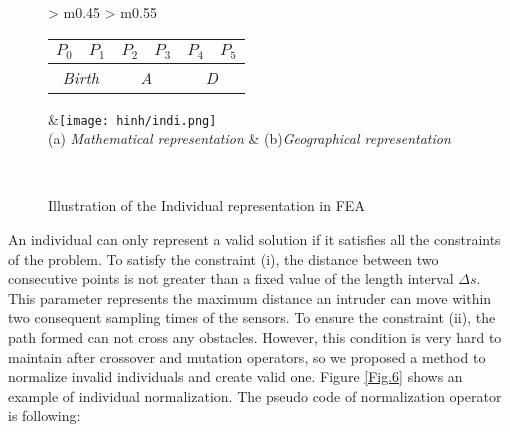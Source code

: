 \documentclass[final]{elsarticle}
\begin{document}
\begin{figure*}[h]
	\renewcommand{\arraystretch}{1.5}
	\centering
	\begin{tabular}{ >{\centering\arraybackslash} m{0.45\linewidth} >{\centering\arraybackslash} m{0.55\linewidth} }
		\begin{tabular}{|c|c|c|c|c|c|}
			\hline 
			$P_0$ & $P_1$ & $P_2$ & $P_3$ & $P_4$ & $P_5$  \\
			\hline \hline
			\multicolumn{2}{|c|}{\textit{Birth}} & \multicolumn{2}{c|}{\textit{A}}  & \multicolumn{2}{c|}{\textit{D}}  \\
			\hline
		\end{tabular} &\texttt{[image: hinh/indi.png]} \\
		(a) \textit{Mathematical representation} & (b)\textit{Geographical representation} \\
	\end{tabular}
	\\
	\caption{Illustration of the Individual representation in FEA
	}
	\label{Fig.4}       %
\end{figure*}

An individual can only represent a valid solution if it satisfies all the constraints of the problem. To satisfy the constraint (i), the distance between two consecutive points is not greater than a fixed value of the length interval $\Delta s$. This parameter represents the maximum distance an intruder can move within two consequent sampling times of the sensors. To ensure the constraint (ii), the path formed can not cross any obstacles. However, this condition is very hard to maintain after crossover and mutation operators, so we proposed a method to normalize invalid individuals and create valid one. Figure \ref{Fig.6} shows an example of individual normalization. The pseudo code of normalization operator is following:
\end{document}
